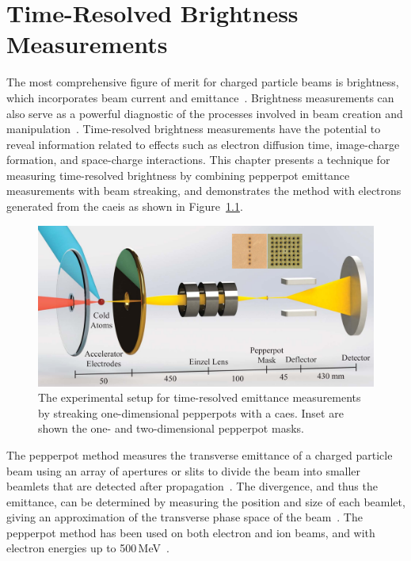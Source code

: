 \chapter{Time-Resolved Brightness Measurements}\label{chapter:brightness}

The most comprehensive figure of merit for charged particle beams is brightness, which incorporates beam current and emittance~\cite{reiser_theory_2008}.
Brightness measurements can also serve as a powerful diagnostic of the processes involved in beam creation and manipulation~\cite{mills_brightness_1980,qiang_three-dimensional_2006,bazarov_maximum_2009}.
Time-resolved brightness measurements have the potential to reveal information related to effects such as electron diffusion time, image-charge formation, and space-charge interactions.
This chapter presents a technique for measuring time-resolved brightness by combining pepperpot emittance measurements with beam streaking, and demonstrates the method with electrons generated from the \gls{caeis} as shown in Figure~\ref{figure:emittance_schematic_render}.

\begin{figure}
\center
\includegraphics[width=\linewidth]{part2/Figs/render.pdf}
\caption{The experimental setup for time-resolved emittance measurements by streaking one-dimensional pepperpots with a \gls{caes}. Inset are shown the one- and two-dimensional pepperpot masks.}
\label{figure:emittance_schematic_render}
\end{figure}

The pepperpot method measures the transverse emittance of a charged particle beam using an array of apertures or slits to divide the beam into smaller beamlets that are detected after propagation~\cite{collins_extraction_1964,van_steenbergen_evaluation_1967,wang_beam_1991,brunetti_low_2010}.
The divergence, and thus the emittance, can be determined by measuring the position and size of each beamlet, giving an approximation of the transverse phase space of the beam~\cite{zhang_emittance_1996,wang_beam_1991}.
The pepperpot method has been used on both electron and ion beams, and with electron energies up to 500\,MeV~\cite{delerue_single-shot_2010}.

